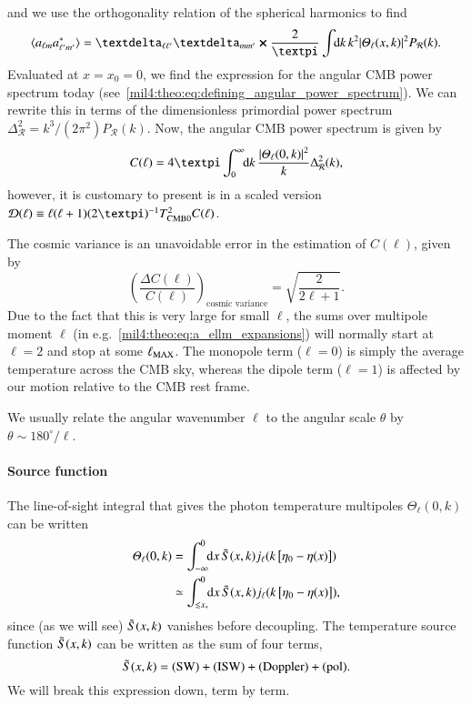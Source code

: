 and we use the orthogonality relation of the spherical harmonics to find
\begin{equation}
    \langle a\ellm a^*\ellmp \rangle = \kroneckerdelta{\ell \ell'} \kroneckerdelta{m m'} \cross \frac{2}{\pi}\int \dx{k} k^2  \abs{\Theta_{\ell}(x,k)}^2P_\mathcal{R}(k).
\end{equation}
Evaluated at $x=x_0=0$, we find the expression for the angular CMB power spectrum today (see~\cref{mil4:theo:eq:defining_angular_power_spectrum}). We can rewrite this in terms of the dimensionless primordial power spectrum $\Delta^2_\mathcal{R} = k^3/(2\pi^2) P_\mathcal{R}(k)$. Now, the angular CMB power spectrum is given by
\begin{equation}\label{mil4:theo:eq:C_of_ell_final}
    C(\ell) = 4\pi \int_0^{\infty} \dx{k} \frac{\abs{\Theta_\ell(0,k)}^2}{k} \Delta_\mathcal{R}^2(k),
\end{equation}
however, it is customary to present is in a scaled version $\mathcal{D}(\ell) \equiv \ell (\ell +1) (2\pi)^{-1} \TCMB^2 C(\ell)$.

The cosmic variance is an unavoidable error in the estimation of $C(\ell)$, given by 
\begin{equation}\label{mil4:theo:eq:cosmic_variance}
    \left( \frac{\Delta C(\ell)}{C(\ell)}\right)_\text{cosmic variance} = \sqrt{\frac{2}{2\ell +1}}.
\end{equation}
Due to the fact that this is very large for small $\ell$, the sums over multipole moment $\ell$ (in e.g.~\cref{mil4:theo:eq:a_ellm_expansions}) will normally start at $\ell=2$ and stop at some $\ell_\mathrm{MAX}$. The monopole term ($\ell=0$) is simply the average temperature across the CMB sky, whereas the dipole term ($\ell=1$) is affected by our motion relative to the CMB rest frame. 

We usually relate the angular wavenumber $\ell$ to the angular scale $\theta$ by $\theta \sim 180^{\circ} /\ell$. 


\paragraph{Source function}
    The line-of-sight integral that gives the photon temperature multipoles $\Theta_\ell(0,k)$ can be written
    \begin{equation}\label{mil4:theo:eq:los_integration}
    \begin{split}
        \varTheta_\ell (0, k) &= \int_{-\infty}^{0} \!\!\mathop{}\!\mathrm{d} {x}\, \tilde{S}(x,k) j_\ell(k\left[\eta_0 -\eta(x)\right]) \\
        &\simeq  \int_{\lesssim x_*}^{0} \!\!\mathop{}\!\mathrm{d} {x}\, \tilde{S}(x,k) j_\ell(k\left[\eta_0 -\eta(x)\right]),
    \end{split}
    \end{equation}
    since (as we will see) $\tilde{S}(x,k)$ vanishes before decoupling. The temperature source function $\tilde{S}(x,k)$ can be written as the sum of four terms,
    \begin{equation}\label{mil4:theo:eq:source_function_four_terms}
        \tilde{S}(x,k) = \text{(SW)} + \text{(ISW)} + \text{(Doppler)} + \text{(pol)}.
    \end{equation}
    We will break this expression down, term by term. 

